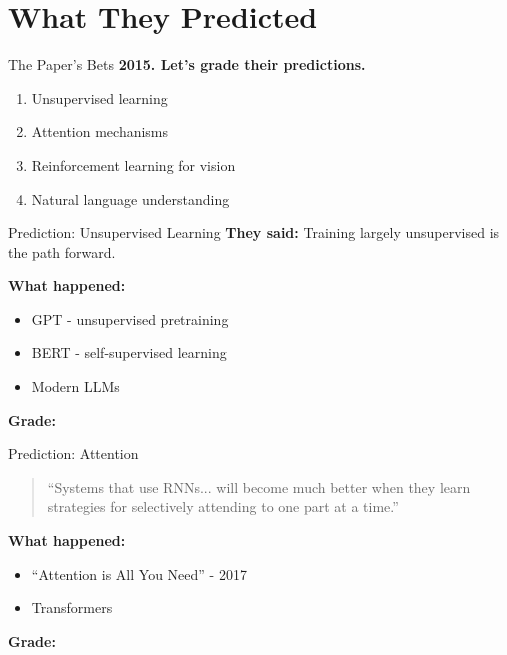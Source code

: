 \section{What They Predicted}

\begin{frame}{The Paper's Bets}
    \textbf{2015. Let's grade their predictions.}
    
    \vspace{1em}
    \begin{enumerate}
        \item Unsupervised learning
        \item Attention mechanisms
        \item Reinforcement learning for vision
        \item Natural language understanding
    \end{enumerate}
\end{frame}

\begin{frame}{Prediction: Unsupervised Learning}
    \textbf{They said:} Training largely unsupervised is the path forward.
    
    \vspace{1em}
    \textbf{What happened:}
    \begin{itemize}
        \item GPT - unsupervised pretraining
        \item BERT - self-supervised learning
        \item Modern LLMs
    \end{itemize}
    
    \vspace{1em}
    \textbf{Grade: \checkmark}
\end{frame}

\begin{frame}{Prediction: Attention}
    \begin{quote}
        ``Systems that use RNNs... will become much better when they learn strategies for selectively attending to one part at a time.''
    \end{quote}
    
    \vspace{1em}
    \textbf{What happened:}
    \begin{itemize}
        \item ``Attention is All You Need'' - 2017
        \item Transformers
    \end{itemize}
    
    \vspace{1em}
    \textbf{Grade: \checkmark\checkmark}
\end{frame}

